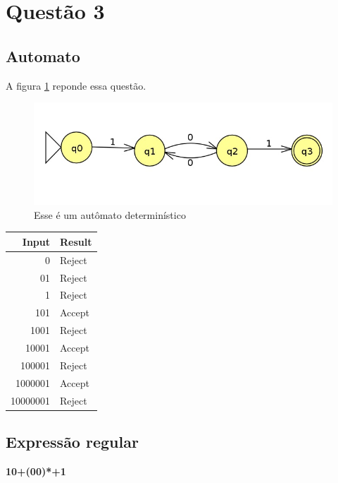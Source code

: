 \documentclass[11pt]{article}
\begin{document}
\section{Questão 3}
\label{sec:orgca15675}
\subsection{Automato}
\label{sec:orgb6af73b}
A figura \ref{fig:org84f16e5} reponde essa questão. 

\begin{figure}[htbp]
\centering
\includegraphics[width=.9\linewidth]{./q3/q3.jpg}
\caption{\label{fig:org84f16e5}
Esse é um autômato determinístico}
\end{figure}

\begin{center}
\begin{tabular}{rl}
Input & Result\\
\hline
0 & Reject\\
01 & Reject\\
1 & Reject\\
101 & Accept\\
1001 & Reject\\
10001 & Accept\\
100001 & Reject\\
1000001 & Accept\\
10000001 & Reject\\
\end{tabular}
\end{center}
\subsection{Expressão regular}
\label{sec:org7935f71}

\textbf{10+(00)*+1} 
\end{document}
